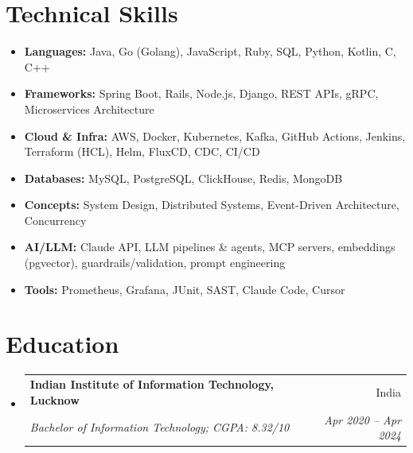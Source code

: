 \documentclass[letterpaper,10pt]{article}
\makeatletter
\newcommand{\resumeSubheading}[4]{
  \item[]
    \begin{tabular*}{0.97\textwidth}{l@{\extracolsep{\fill}}r}
      \textbf{#1} & #2 \\
      \textit{\small#3} & \textit{\small #4} \\
    \end{tabular*}
}
\newcommand{\resumeSubHeadingListStart}{\vspace{-4pt}\begin{itemize}[leftmargin=*,itemsep=5pt,parsep=0pt]}
\newcommand{\resumeSubHeadingListEnd}{\end{itemize}}
\makeatother
\begin{document}
\section{Technical Skills}
\begin{itemize}[leftmargin=*, itemsep=1pt, parsep=0pt]
      \selectfont\small
      \setlength\itemsep{0em}
      \setlength\parsep{0em}
      \item \textbf{Languages:} Java, Go (Golang), JavaScript, Ruby, SQL, Python, Kotlin, C, C++
      \item \textbf{Frameworks:} Spring Boot, Rails, Node.js, Django, REST APIs, gRPC, Microservices Architecture
      \item \textbf{Cloud \& Infra:} AWS, Docker, Kubernetes, Kafka, GitHub Actions, Jenkins, Terraform (HCL), Helm, FluxCD, CDC, CI/CD
      \item \textbf{Databases:} MySQL, PostgreSQL, ClickHouse, Redis, MongoDB
      \item \textbf{Concepts:} System Design, Distributed Systems, Event-Driven Architecture, Concurrency
      \item \textbf{AI/LLM:} Claude API, LLM pipelines \& agents, MCP servers, embeddings (pgvector), guardrails/validation, prompt engineering
      \item \textbf{Tools:} Prometheus, Grafana, JUnit, SAST, Claude Code, Cursor
\end{itemize}

\section{Education}
\resumeSubHeadingListStart
\resumeSubheading
{Indian Institute of Information Technology, Lucknow}{India}
{Bachelor of Information Technology;  CGPA: 8.32/10}{Apr 2020 -- Apr 2024}
\resumeSubHeadingListEnd
\end{document}
